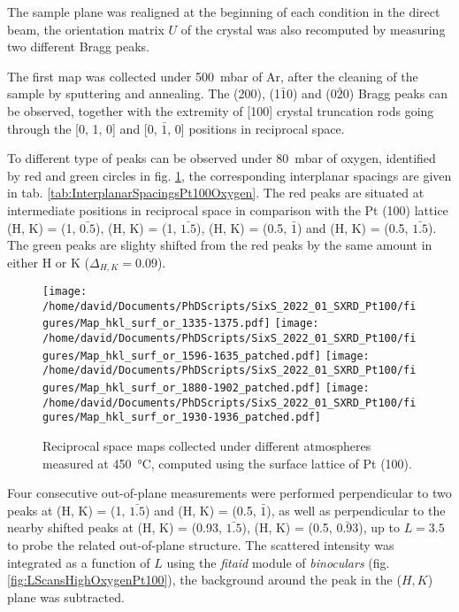 The sample plane was realigned at the beginning of each condition in the direct beam, the orientation matrix $U$ of the crystal \parencite{Schleputz2011} was also recomputed by measuring two different Bragg peaks.

The first map was collected under \qty{500}{\milli\bar} of Ar, after the cleaning of the sample by sputtering and annealing.
The (200), (1$\bar{1}$0) and (0$\bar{2}$0) Bragg peaks can be observed, together with the extremity of [100] crystal truncation rods going through the [0, 1, 0] and [0, $\bar{1}$, 0] positions in reciprocal space.

To different type of peaks can be observed under \qty{80}{\milli\bar} of oxygen, identified by red and green circles in fig. \ref{fig:MapsPt100A}, the corresponding interplanar spacings are given in tab. \ref{tab:InterplanarSpacingsPt100Oxygen}.
The red peaks are situated at intermediate positions in reciprocal space in comparison with the Pt (100) lattice (H, K) = (1, $\bar{0.5}$), (H, K) = (1, $\bar{1.5}$), (H, K) = (0.5, $\bar{1}$) and (H, K) = (0.5, $\bar{1.5}$).
The green peaks are slighty shifted from the red peaks by the same amount in either H or K ($\Delta_{H,K} = 0.09$).

\begin{figure}[!htb]
    \centering
    \texttt{[image: /home/david/Documents/PhDScripts/SixS\_2022\_01\_SXRD\_Pt100/figures/Map\_hkl\_surf\_or\_1335-1375.pdf]}
    \texttt{[image: /home/david/Documents/PhDScripts/SixS\_2022\_01\_SXRD\_Pt100/figures/Map\_hkl\_surf\_or\_1596-1635\_patched.pdf]}
    \texttt{[image: /home/david/Documents/PhDScripts/SixS\_2022\_01\_SXRD\_Pt100/figures/Map\_hkl\_surf\_or\_1880-1902\_patched.pdf]}
    \texttt{[image: /home/david/Documents/PhDScripts/SixS\_2022\_01\_SXRD\_Pt100/figures/Map\_hkl\_surf\_or\_1930-1936\_patched.pdf]}
    \caption{
        Reciprocal space maps collected under different atmospheres measured at \qty{450}{\degreeCelsius}, computed using the surface lattice of Pt (100).
    }
    \label{fig:MapsPt100A}
\end{figure}

Four consecutive out-of-plane measurements were performed perpendicular to two peaks at (H, K) = (1, $\bar{1.5}$) and (H, K) = (0.5, $\bar{1}$), as well as perpendicular to the nearby shifted peaks at (H, K) = (0.93, $\bar{1.5}$), (H, K) = (0.5, $\bar{0.93}$), up to $L=3.5$ to probe the related out-of-plane structure.
The scattered intensity was integrated as a function of $L$ using the \textit{fitaid} module of \textit{binoculars} (fig. \ref{fig:LScansHighOxygenPt100}), the background around the peak in the ($H, K$) plane was subtracted.

